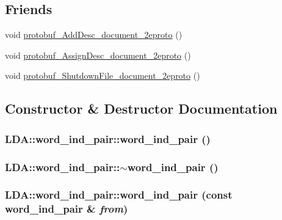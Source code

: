 \subsection*{Friends}
\begin{DoxyCompactItemize}
\item 
void \hyperlink{class_l_d_a_1_1word__ind__pair_a9ca7998089dddfe828221d1f41bf4f9c}{protobuf\_\-AddDesc\_\-document\_\-2eproto} ()
\item 
void \hyperlink{class_l_d_a_1_1word__ind__pair_a5c1ac521cee58e6270c99a8c012c8950}{protobuf\_\-AssignDesc\_\-document\_\-2eproto} ()
\item 
void \hyperlink{class_l_d_a_1_1word__ind__pair_af79773dc456499799fb950f62b8cd291}{protobuf\_\-ShutdownFile\_\-document\_\-2eproto} ()
\end{DoxyCompactItemize}


\subsection{Constructor \& Destructor Documentation}
\hypertarget{class_l_d_a_1_1word__ind__pair_a9b75330b8611487612a6f2a2cd64ef68}{
\subsubsection[{word\_\-ind\_\-pair}]{\setlength{\rightskip}{0pt plus 5cm}LDA::word\_\-ind\_\-pair::word\_\-ind\_\-pair ()}}
\label{class_l_d_a_1_1word__ind__pair_a9b75330b8611487612a6f2a2cd64ef68}
\hypertarget{class_l_d_a_1_1word__ind__pair_a1dd434bc6f11a87160e22ac554ae0a86}{
\subsubsection[{$\sim$word\_\-ind\_\-pair}]{\setlength{\rightskip}{0pt plus 5cm}LDA::word\_\-ind\_\-pair::$\sim$word\_\-ind\_\-pair ()}}
\label{class_l_d_a_1_1word__ind__pair_a1dd434bc6f11a87160e22ac554ae0a86}
\hypertarget{class_l_d_a_1_1word__ind__pair_a6bf43ac2337925978a6525f8a41b519c}{
\subsubsection[{word\_\-ind\_\-pair}]{\setlength{\rightskip}{0pt plus 5cm}LDA::word\_\-ind\_\-pair::word\_\-ind\_\-pair (const {\bf word\_\-ind\_\-pair} \& {\em from})}}
\label{class_l_d_a_1_1word__ind__pair_a6bf43ac2337925978a6525f8a41b519c}


